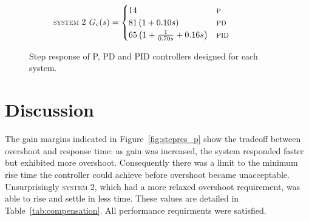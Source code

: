 \documentclass[a4paper,10pt,twocolumn]{article}
\begin{document}
\begin{figure}[h!]
\begin{subfigure}{0.5\textwidth}
		\caption{\textsc{system 2}\quad\scriptsize%
			$ G_c(s) =
			\begin{cases}
				14 & \textsc{p} \\
				81\left(1+0.10s\right) & \textsc{pd} \\
				65\left(1+\frac{1}{0.70s}+0.16s\right) & \textsc{pid}
			\end{cases}$
		}
	\end{subfigure}
	\caption{Step response of P, PD and PID controllers designed for each system.}
	\label{fig:stepres_pid}
\end{figure}

\section{Discussion}

The gain margins indicated in Figure~\ref{fig:stepres_p} show the tradeoff between overshoot and response time: as gain was increased, the system responded faster but exhibited more overshoot. Consequently there was a limit to the minimum rise time the controller could achieve before overshoot became unacceptable. Unsurprisingly \textsc{system 2}, which had a more relaxed overshoot requirement, was able to rise and settle in less time. These values are detailed in Table~\ref{tab:compensation}. All performance requirments were satisfied.
\end{document}
